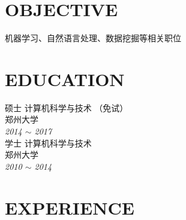 \documentclass[line, margin]{res}
\begin{document}
\address{likun@stu.zzu.edu.cn}
\address{152-2511-1797}

\begin{resume}
\vspace {5pt}
\section{OBJECTIVE}
 { 机器学习、自然语言处理、数据挖掘等相关职位}

\section{EDUCATION} 
 { 硕士 计算机科学与技术 （免试）  \\
 郑州大学 }\\
 {\sl 2014 $\sim$ 2017} \\
[15pt]
 { 学士 计算机科学与技术 \\
 郑州大学 } \\
 {\sl 2010 $\sim$ 2014 }
 
\section{EXPERIENCE}


\end{resume}
\end{document}
